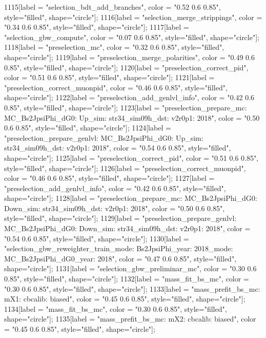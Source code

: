 {	1115[label = "selection_bdt_add_branches", color = "0.52 0.6 0.85", style="filled", shape="circle"];
	1116[label = "selection_merge_strippings", color = "0.34 0.6 0.85", style="filled", shape="circle"];
	1117[label = "selection_gbw_compute", color = "0.07 0.6 0.85", style="filled", shape="circle"];
	1118[label = "preselection_mc", color = "0.32 0.6 0.85", style="filled", shape="circle"];
	1119[label = "preselection_merge_polarities", color = "0.49 0.6 0.85", style="filled", shape="circle"];
	1120[label = "preselection_correct_pid", color = "0.51 0.6 0.85", style="filled", shape="circle"];
	1121[label = "preselection_correct_muonpid", color = "0.46 0.6 0.85", style="filled", shape="circle"];
	1122[label = "preselection_add_genlvl_info", color = "0.42 0.6 0.85", style="filled", shape="circle"];
	1123[label = "preselection_prepare_mc\nmode: MC_Bs2JpsiPhi_dG0\npolarity: Up\nstrip_sim: str34_sim09h_dst\nversion: v2r0p1\nyear: 2018", color = "0.50 0.6 0.85", style="filled", shape="circle"];
	1124[label = "preselection_prepare_genlvl\nmode: MC_Bs2JpsiPhi_dG0\npolarity: Up\nstrip_sim: str34_sim09h_dst\nversion: v2r0p1\nyear: 2018", color = "0.54 0.6 0.85", style="filled", shape="circle"];
	1125[label = "preselection_correct_pid", color = "0.51 0.6 0.85", style="filled", shape="circle"];
	1126[label = "preselection_correct_muonpid", color = "0.46 0.6 0.85", style="filled", shape="circle"];
	1127[label = "preselection_add_genlvl_info", color = "0.42 0.6 0.85", style="filled", shape="circle"];
	1128[label = "preselection_prepare_mc\nmode: MC_Bs2JpsiPhi_dG0\npolarity: Down\nstrip_sim: str34_sim09h_dst\nversion: v2r0p1\nyear: 2018", color = "0.50 0.6 0.85", style="filled", shape="circle"];
	1129[label = "preselection_prepare_genlvl\nmode: MC_Bs2JpsiPhi_dG0\npolarity: Down\nstrip_sim: str34_sim09h_dst\nversion: v2r0p1\nyear: 2018", color = "0.54 0.6 0.85", style="filled", shape="circle"];
	1130[label = "selection_gbw_reweighter_train\ndata_mode: Bs2JpsiPhi\ndata_year: 2018\nmc_mode: MC_Bs2JpsiPhi_dG0\nmc_year: 2018", color = "0.47 0.6 0.85", style="filled", shape="circle"];
	1131[label = "selection_gbw_preliminar_mc", color = "0.30 0.6 0.85", style="filled", shape="circle"];
	1132[label = "mass_fit_bs_mc", color = "0.30 0.6 0.85", style="filled", shape="circle"];
	1133[label = "mass_prefit_bs_mc\nmassbin: mX1\nmassmodel: cbcalib\ntrigger: biased", color = "0.45 0.6 0.85", style="filled", shape="circle"];
	1134[label = "mass_fit_bs_mc", color = "0.30 0.6 0.85", style="filled", shape="circle"];
	1135[label = "mass_prefit_bs_mc\nmassbin: mX2\nmassmodel: cbcalib\ntrigger: biased", color = "0.45 0.6 0.85", style="filled", shape="circle"];
}
